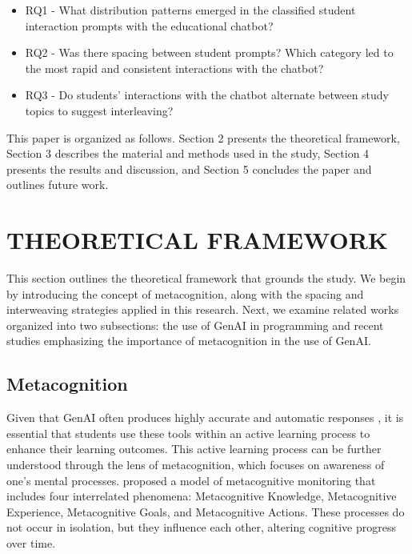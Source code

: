 \documentclass[a4paper,twoside]{article}
\begin{document}
\begin{itemize}
  \item RQ1 - What distribution patterns emerged in the classified student
  interaction prompts with the educational chatbot?
  \item RQ2 - Was there spacing between student prompts? Which category led to
  the most rapid and consistent interactions with the chatbot?
  \item RQ3 - Do students' interactions with the chatbot alternate between study
  topics to suggest interleaving?
\end{itemize}

This paper is organized as follows. Section 2 presents the theoretical
framework, Section 3 describes the material and methods used in the study,
Section 4 presents the results and discussion, and Section 5 concludes the
paper and outlines future work.

\section{\uppercase{Theoretical Framework}}

This section outlines the theoretical framework that grounds the study. We
begin by introducing the concept of metacognition, along with the spacing and
interweaving strategies applied in this research. Next, we examine related works
 organized into two subsections: the use of GenAI in programming and recent
 studies emphasizing the importance of metacognition in the use of GenAI.

\subsection{Metacognition}

Given that GenAI often produces highly accurate and automatic responses
\citep{Puryear22}, it is essential that students use these tools within an
active learning process to enhance their learning outcomes. This active
learning process can be further understood through the lens of metacognition,
which focuses on awareness of one's mental processes. \cite{flavell79}
proposed a model of metacognitive monitoring that includes four interrelated
phenomena: Metacognitive Knowledge, Metacognitive Experience, Metacognitive
Goals, and Metacognitive Actions. These processes do not occur in isolation, but
they influence each other, altering cognitive progress over time.
\end{document}
